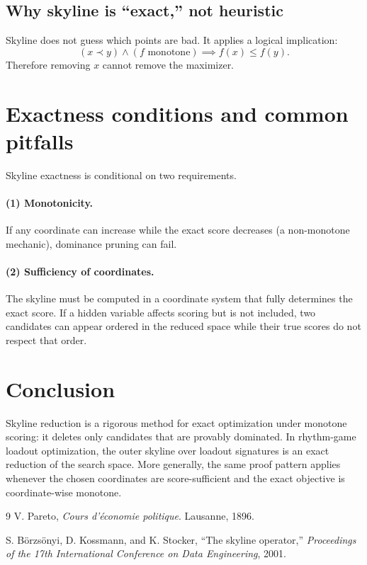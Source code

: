 \documentclass[11pt]{article}
\theoremstyle{plain}
\begin{document}
\subsection{Why skyline is ``exact,'' not heuristic}
Skyline does not guess which points are bad. It applies a logical implication:
\[
(x\prec y) \wedge (f\text{ monotone}) \implies f(x)\le f(y).
\]
Therefore removing $x$ cannot remove the maximizer.

\section{Exactness conditions and common pitfalls}
Skyline exactness is conditional on two requirements.

\paragraph{(1) Monotonicity.} If any coordinate can increase while the exact score decreases (a non-monotone mechanic), dominance pruning can fail.

\paragraph{(2) Sufficiency of coordinates.} The skyline must be computed in a coordinate system that fully determines the exact score. If a hidden variable affects scoring but is not included, two candidates can appear ordered in the reduced space while their true scores do not respect that order.

\section{Conclusion}
Skyline reduction is a rigorous method for exact optimization under monotone scoring: it deletes only candidates that are provably dominated. In rhythm-game loadout optimization, the outer skyline over loadout signatures is an exact reduction of the search space. More generally, the same proof pattern applies whenever the chosen coordinates are score-sufficient and the exact objective is coordinate-wise monotone.

\begin{thebibliography}{9}
V. Pareto, \emph{Cours d'\'economie politique}. Lausanne, 1896.

S. B\"orzs\"onyi, D. Kossmann, and K. Stocker, ``The skyline operator,'' \emph{Proceedings of the 17th International Conference on Data Engineering}, 2001.
\end{thebibliography}
\end{document}
